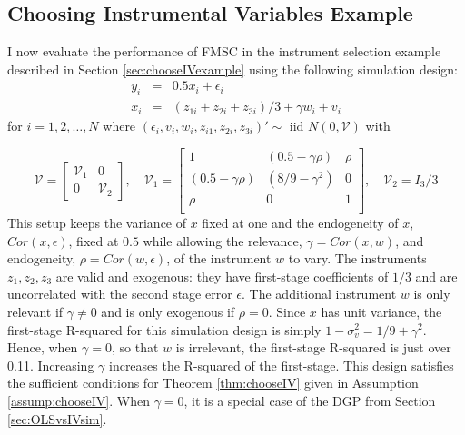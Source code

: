 \subsection{Choosing Instrumental Variables Example}
\label{sec:chooseIVsim}
I now evaluate the performance of FMSC in the instrument selection example described in Section \ref{sec:chooseIVexample} using the following simulation design:
\begin{eqnarray}
		y_i &=& 0.5 x_i + \epsilon_i\\ 
		\label{eq:chooseIVDGP1}
		x_i &=& (z_{1i} + z_{2i} + z_{3i}) /3 + \gamma w_i + v_i 
		\label{eq:chooseIVDGP2}
	\end{eqnarray}
for $i=1, 2, \hdots, N$ where $(\epsilon_i, v_i, w_i, z_{i1}, z_{2i}, z_{3i})' \sim \mbox{ iid  } N(0,\mathcal{V})$ with

\begin{equation}	
	\mathcal{V} = \left[  \begin{array}
		{cc} \mathcal{V}_1 & 0 \\ 0 & \mathcal{V}_2
	\end{array}\right], \quad
	\mathcal{V}_1 = \left[ \begin{array}
		{ccc} 
		1 & (0.5 - \gamma \rho) & \rho \\
		(0.5 - \gamma \rho) & (8/9 - \gamma^2) & 0\\ 
		\rho & 0 & 1 \\ 
	\end{array} \right], \quad \mathcal{V}_2 = I_3 / 3
	\label{eq:chooseIVDGP3}
\end{equation}
This setup keeps the variance of $x$ fixed at one and the endogeneity of $x$, $Cor(x, \epsilon)$, fixed at $0.5$ while allowing the relevance, $\gamma = Cor(x,w)$, and endogeneity, $\rho = Cor(w, \epsilon)$, of the instrument $w$ to vary.
The instruments $z_1, z_2, z_3$ are valid and exogenous: they have first-stage coefficients of $1/3$ and are uncorrelated with the second stage error $\epsilon$.
The additional instrument $w$ is only relevant if $\gamma \neq 0$ and is only exogenous if $\rho = 0$.
Since $x$ has unit variance, the first-stage R-squared for this simulation design is simply $1 - \sigma_v^2 = 1/9 + \gamma^2$.
Hence, when  $\gamma = 0$, so that $w$ is irrelevant, the first-stage R-squared is just over 0.11.
Increasing $\gamma$ increases the R-squared of the first-stage.
This design satisfies the sufficient conditions for Theorem \ref{thm:chooseIV} given in Assumption \ref{assump:chooseIV}.
When $\gamma = 0$, it is a special case of the DGP from Section \ref{sec:OLSvsIVsim}.

